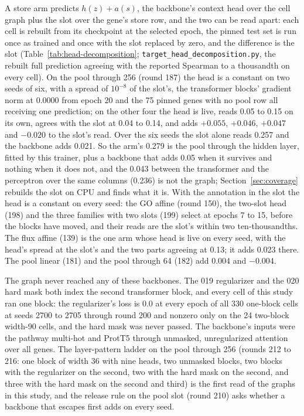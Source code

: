 A store arm predicts $h(z) + a(s)$, the backbone's context head over the cell graph
plus the slot over the gene's store row, and the two can be read apart: each cell is
rebuilt from its checkpoint at the selected epoch, the pinned test set is run once as
trained and once with the slot replaced by zero, and the difference is the slot
(Table~\ref{tab:head-decomposition}; \texttt{target\_head\_decomposition.py}, the
rebuilt full prediction agreeing with the reported Spearman to a thousandth on every
cell). On the pool through 256 (round 187) the head is a constant on two seeds of six,
with a spread of $10^{-8}$ of the slot's, the transformer blocks' gradient norm at
0.0000 from epoch 20 and the 75 pinned genes with no pool row all receiving one
prediction; on the other four the head is live, reads 0.05 to 0.15 on its own, agrees
with the slot at 0.04 to 0.14, and adds $+0.055$, $+0.046$, $+0.047$ and $-0.020$ to
the slot's read. Over the six seeds the slot alone reads 0.257 and the backbone adds
0.021. So the arm's 0.279 is the pool through the hidden layer, fitted by this trainer,
plus a backbone that adds 0.05 when it survives and nothing when it does not, and the
0.043 between the transformer and the perceptron over the same columns (0.236) is not
the graph; Section~\ref{sec:coverage} rebuilds the slot on CPU and finds what it is.
With the annotation in
the slot the head is a constant on every seed: the GO affine (round 150), the two-slot
head (198) and the three families with two slots (199) select at epochs 7 to 15, before
the blocks have moved, and their reads are the slot's within two ten-thousandths. The flux
affine (139) is the one arm whose head is live on every seed, with the head's spread
at the slot's and the two parts agreeing at 0.13; it adds 0.023 there. The pool linear
(181) and the pool through 64 (182) add 0.004 and $-0.004$.

The graph never reached any of these backbones. The 019 regularizer and the 020 hard
mask both index the second transformer block, and every cell of this study ran one
block: the regularizer's loss is 0.0 at every epoch of all 330 one-block cells at seeds
2700 to 2705 through round 200 and nonzero only on the 24 two-block width-90 cells,
and the hard mask was never passed.
The backbone's inputs were the pathway multi-hot and ProtT5 through unmasked,
unregularized attention over all genes. The layer-pattern ladder on the pool through
256 (rounds 212 to 216: one block of width 36 with nine heads, two unmasked blocks, two
blocks with the regularizer on the second, two with the hard mask on the second, and
three with the hard mask on the second and third) is the first read of the graphs in
this study, and the release rule on the pool slot (round 210) asks whether a backbone
that escapes first adds on every seed.

